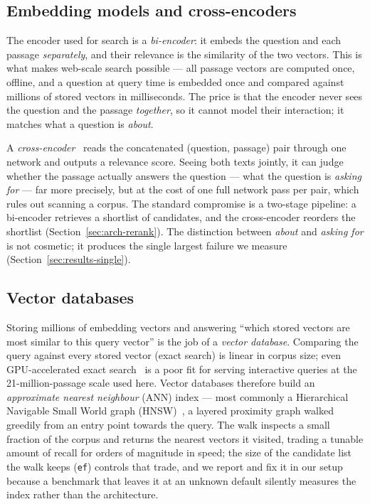 \subsection{Embedding models and cross-encoders}
\label{sec:encoders}

The encoder used for search is a \emph{bi-encoder}: it embeds the question
and each passage \emph{separately}, and their relevance is the similarity
of the two vectors. This is what makes web-scale search possible --- all
passage vectors are computed once, offline, and a question at query time is
embedded once and compared against millions of stored vectors in
milliseconds. The price is that the encoder never sees the question and the
passage \emph{together}, so it cannot model their interaction; it matches
what a question is \emph{about}.

A \emph{cross-encoder}~\citep{nogueira2019passage} reads the concatenated
(question, passage) pair through one network and outputs a relevance score.
Seeing both texts jointly, it can judge whether the passage actually
answers the question --- what the question is \emph{asking for} --- far
more precisely, but at the cost of one full network pass per pair, which
rules out scanning a corpus. The standard compromise is a two-stage
pipeline: a bi-encoder retrieves a shortlist of candidates, and the
cross-encoder reorders the shortlist (Section~\ref{sec:arch-rerank}). The
distinction between \emph{about} and \emph{asking for} is not cosmetic; it
produces the single largest failure we measure
(Section~\ref{sec:results-single}).

\subsection{Vector databases}
\label{sec:vectordb}

Storing millions of embedding vectors and answering ``which stored vectors
are most similar to this query vector'' is the job of a \emph{vector
database}. Comparing the query against every stored vector (exact search)
is linear in corpus size; even GPU-accelerated exact
search~\citep{johnson2019faiss} is a poor fit for serving interactive
queries at the 21-million-passage scale used here. Vector databases therefore build an
\emph{approximate nearest neighbour} (ANN) index --- most commonly a
Hierarchical Navigable Small World graph (HNSW)~\citep{malkov2020hnsw}, a
layered proximity graph walked greedily from an entry point towards the
query. The walk inspects a small fraction of the corpus and returns the
nearest vectors it visited, trading a tunable amount of recall for orders of
magnitude in speed; the size of the candidate list the walk keeps
(\texttt{ef}) controls that trade, and we report and fix it in our setup
because a benchmark that leaves it at an unknown default silently measures
the index rather than the architecture.

